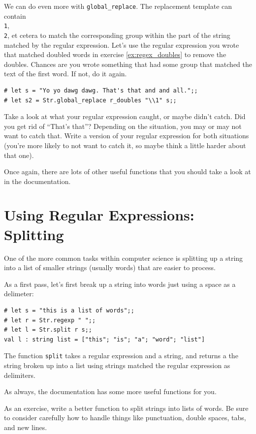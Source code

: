 \documentclass[10pt]{book}
\begin{document}
We can do even more with {\tt global\_replace}. The replacement template can contain {\tt \\1}, {\tt \\2}, et cetera to match the corresponding group within the part of the string matched by the regular expression. Let's use the regular expression you wrote that matched doubled words in exercise \ref{ex:regex_doubles} to remove the doubles. Chances are you wrote something that had some group that matched the text of the first word. If not, do it again.

\beforeverb
\begin{verbatim}
# let s = "Yo yo dawg dawg. That's that and and all.";;
# let s2 = Str.global_replace r_doubles "\\1" s;;
\end{verbatim}
\afterverb
Take a look at what your regular expression caught, or maybe didn't catch. Did you get rid of ``That's that''? Depending on the situation, you may or may not want to catch that. Write a version of your regular expression for both situations (you're more likely to not want to catch it, so maybe think a little harder about that one).

Once again, there are lots of other useful functions that you should take a look at in the documentation.

\section{Using Regular Expressions: Splitting}

One of the more common tasks within computer science is splitting up a string into a list of smaller strings (usually words) that are easier to process.

As a first pass, let's first break up a string into words just using a space as a delimeter:
\beforeverb
\begin{verbatim}
# let s = "this is a list of words";;
# let r = Str.regexp " ";;
# let l = Str.split r s;;
val l : string list = ["this"; "is"; "a"; "word"; "list"]
\end{verbatim}
\afterverb
The function {\tt split} takes a regular expression and a string, and returns a the string broken up into a list using strings matched the regular expression as delimiters.

As always, the documentation has some more useful functions for you.

\begin{ex}
As an exercise, write a better function to split strings into lists of words. Be sure to consider carefully how to handle things like punctuation, double spaces, tabs, and new lines.
\end{ex}
\end{document}
